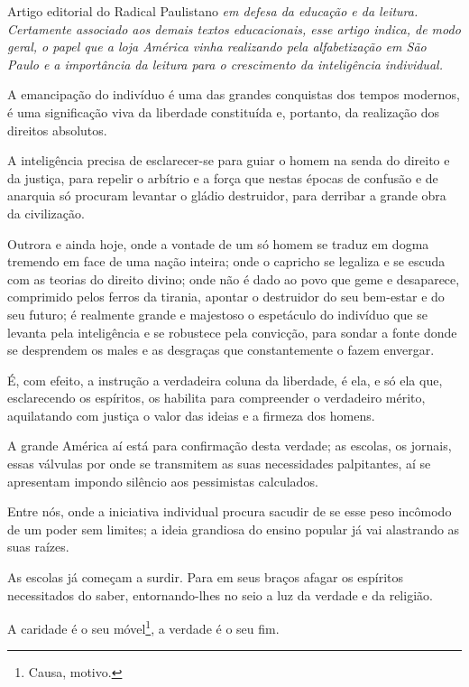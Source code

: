 \begin{didascalia}
Artigo editorial do Radical Paulistano \emph{em defesa da educação e da
leitura. Certamente associado aos demais textos educacionais, esse
artigo indica, de modo geral, o papel que a loja América vinha
realizando pela alfabetização em São Paulo e a importância da leitura
para o crescimento da inteligência individual.}
\end{didascalia}

A emancipação do indivíduo é uma das grandes conquistas dos tempos
modernos, é uma significação viva da liberdade constituída e, portanto,
da realização dos direitos absolutos.

A inteligência precisa de esclarecer-se para guiar o homem na senda do
direito e da justiça, para repelir o arbítrio e a força que nestas
épocas de confusão e de anarquia só procuram levantar o gládio
destruidor, para derribar a grande obra da civilização.

Outrora e ainda hoje, onde a vontade de um só homem se traduz em dogma
tremendo em face de uma nação inteira; onde o capricho se legaliza e se
escuda com as teorias do direito divino; onde não é dado ao povo que
geme e desaparece, comprimido pelos ferros da tirania, apontar o
destruidor do seu bem-estar e do seu futuro; é realmente grande e
majestoso o espetáculo do indivíduo que se levanta pela inteligência e
se robustece pela convicção, para sondar a fonte donde se desprendem os
males e as desgraças que constantemente o fazem envergar.

É, com efeito, a instrução a verdadeira coluna da liberdade, é ela, e só
ela que, esclarecendo os espíritos, os habilita para compreender o
verdadeiro mérito, aquilatando com justiça o valor das ideias e a
firmeza dos homens.

A grande América aí está para confirmação desta verdade; as escolas, os
jornais, essas válvulas por onde se transmitem as suas necessidades
palpitantes, aí se apresentam impondo silêncio aos pessimistas
calculados.

Entre nós, onde a iniciativa individual procura sacudir de se esse peso
incômodo de um poder sem limites; a ideia grandiosa do ensino popular já
vai alastrando as suas raízes.

As escolas já começam a surdir. Para em seus braços afagar os espíritos
necessitados do saber, entornando-lhes no seio a luz da verdade e da
religião.

A caridade é o seu móvel\footnote{Causa, motivo.}, a verdade é o seu
fim.

